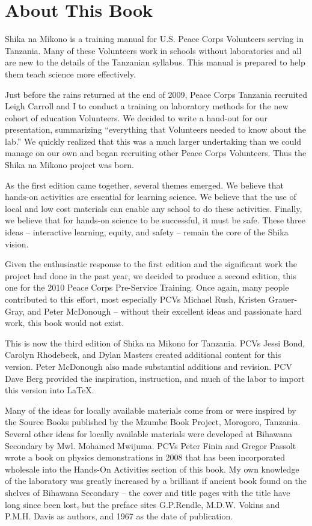 \chapter{About This Book}

Shika na Mikono is a training manual for U.S. Peace Corps Volunteers serving in Tanzania. Many of these Volunteers work in schools without laboratories and all are new to the details of the Tanzanian syllabus. This manual is prepared to help them teach science more effectively.

Just before the rains returned at the end of 2009, 
Peace Corps Tanzania recruited Leigh Carroll and I 
to conduct a training on laboratory methods 
for the new cohort of education Volunteers. 
We decided to write a hand-out for our presentation, 
summarizing ``everything that Volunteers needed to know about the lab.'' 
We quickly realized that this was a much larger undertaking 
than we could manage on our own 
and began recruiting other Peace Corps Volunteers. 
Thus the Shika na Mikono project was born.

As the first edition came together, several themes emerged. 
We believe that hands-on activities are essential for learning science. 
We believe that the use of local and low cost materials 
can enable any school to do these activities. 
Finally, we believe that for hands-on science to be successful, 
it must be safe. 
These three ideas -- interactive learning, equity, and safety -- 
remain the core of the Shika vision.

Given the enthusiastic response to the first edition 
and the significant work the project had done in the past year, 
we decided to produce a second edition, 
this one for the 2010 Peace Corps Pre-Service Training. 
Once again, many people contributed to this effort, 
most especially PCVs Michael Rush, Kristen Grauer-Gray, and Peter McDonough 
-- without their excellent ideas and passionate hard work, 
this book would not exist.

This is now the third edition of Shika na Mikono for Tanzania.
PCVs Jessi Bond, Carolyn Rhodebeck, and Dylan Masters 
created additional content for this version. Peter McDonough 
also made substantial additions and revision. 
PCV Dave Berg provided the inspiration, instruction, 
and much of the labor to import this version into \LaTeX.

Many of the ideas for locally available materials 
come from or were inspired by the Source Books 
published by the Mzumbe Book Project, Morogoro, Tanzania. 
Several other ideas for locally available materials 
were developed at Bihawana Secondary by Mwl. Mohamed Mwijuma. 
PCVs Peter Finin and Gregor Passolt wrote 
a book on physics demonstrations in 2008 
that has been incorporated wholesale 
into the Hands-On Activities section of this book. 
My own knowledge of the laboratory was greatly increased 
by a brilliant if ancient book found on the shelves of Bihawana Secondary -- 
the cover and title pages with the title have long since been lost, 
but the preface sites G.P.Rendle, M.D.W. Vokins and P.M.H. Davis as authors, 
and 1967 as the date of publication.

